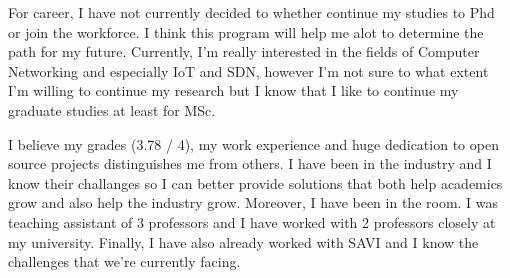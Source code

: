 \documentclass[11pt,a4paper,sans]{moderncv}        %
\begin{document}
For career, I have not currently decided to whether continue my studies to
Phd or join the workforce. I think this program will help me alot to determine
the path for my future. Currently, I'm really interested in the fields of
Computer Networking and especially IoT and SDN, however I'm not sure to what
extent I'm willing to continue my research but I know that I like to continue my
graduate studies at least for MSc.

I believe my grades (3.78 / 4), my work experience and huge dedication
to open source projects distinguishes me from others. I have been in the
industry and I know their challanges so I can better provide solutions that
both help academics grow and also help the industry grow. Moreover, I have been
in the room. I was teaching assistant of 3 professors and I have worked with
2 professors closely at my university. Finally, I have also already worked
with SAVI and I know the challenges that we're currently facing.

\makeletterclosing
\end{document}
